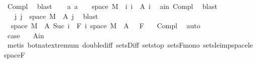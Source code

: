 \begin{isabellebody}
\ Compl{\isacharparenleft}{\kern0pt}{}{\isacharparenright}{\kern0pt}\ \isamarkupfalse%
\ blast\isanewline
\ \ \isamarkupfalse%
\ a{\isacharcolon}{\kern0pt}\ {\isachardoublequoteopen}a\ {\isacharequal}{\kern0pt}\ {\isacharbraceleft}{\kern0pt}{}{\isachardot}{\kern0pt}{\isachardot}{\kern0pt}{\isacharbraceright}{\kern0pt}\ {\isasymtimes}\ space\ M\ {\isacharminus}{\kern0pt}\ {\isacharparenleft}{\kern0pt}{\isasymUnion}i{\isachardot}{\kern0pt}\ {\isacharbraceleft}{\kern0pt}i{\isacharbraceright}{\kern0pt}\ {\isasymtimes}\ A\ i{\isacharparenright}{\kern0pt}{\isachardoublequoteclose}\ \isamarkupfalse%
\ a{\isacharunderscore}{\kern0pt}in\ Compl{\isacharparenleft}{\kern0pt}{}{\isacharparenright}{\kern0pt}\ \isamarkupfalse%
\ blast\isanewline
\ \ \isamarkupfalse%
\ \isamarkupfalse%
\ {\isachardoublequoteopen}{\isachardot}{\kern0pt}{\isachardot}{\kern0pt}{\isachardot}{\kern0pt}\ {\isacharequal}{\kern0pt}\ {\isacharparenleft}{\kern0pt}{\isasymUnion}j{\isachardot}{\kern0pt}\ {\isacharbraceleft}{\kern0pt}j{\isacharbraceright}{\kern0pt}\ {\isasymtimes}\ {\isacharparenleft}{\kern0pt}space\ M\ {\isacharminus}{\kern0pt}\ A\ j{\isacharparenright}{\kern0pt}{\isacharparenright}{\kern0pt}{\isachardoublequoteclose}\ \isamarkupfalse%
\ blast\isanewline
\ \ \isamarkupfalse%
\ \isamarkupfalse%
\ {\isacharasterisk}{\kern0pt}{\isacharcolon}{\kern0pt}\ {\isachardoublequoteopen}{\isacharparenleft}{\kern0pt}space\ M\ {\isacharminus}{\kern0pt}\ A\ {\isacharparenleft}{\kern0pt}Suc\ i{\isacharparenright}{\kern0pt}{\isacharparenright}{\kern0pt}\ {\isasymin}\ F\ i{\isachardoublequoteclose}\ {\isachardoublequoteopen}{\isacharparenleft}{\kern0pt}space\ M\ {\isacharminus}{\kern0pt}\ A\ {}{\isacharparenright}{\kern0pt}\ {\isasymin}\ F\ {}{\isachardoublequoteclose}\ \isamarkupfalse%
\ Compl{\isacharparenleft}{\kern0pt}{}{\isacharcomma}{\kern0pt}{}{\isacharparenright}{\kern0pt}\ \isamarkupfalse%
\ auto\isanewline
\ \ \isacommand{{\isacharbraceleft}{\kern0pt}}\isamarkupfalse%
\isanewline
\ \ \ \ \isamarkupfalse%
\ {}\isanewline
\ \ \ \ \isamarkupfalse%
\ \isamarkupfalse%
\ {\isacharquery}{\kern0pt}case\ \isamarkupfalse%
\ {\isacharasterisk}{\kern0pt}\ A{\isacharunderscore}{\kern0pt}in\ \isamarkupfalse%
\ {\isacharparenleft}{\kern0pt}metis\ bot{\isacharunderscore}{\kern0pt}nat{\isacharunderscore}{\kern0pt}{}{\isachardot}{\kern0pt}extremum\ double{\isacharunderscore}{\kern0pt}diff\ sets{\isachardot}{\kern0pt}Diff\ sets{\isachardot}{\kern0pt}top\ sets{\isacharunderscore}{\kern0pt}F{\isacharunderscore}{\kern0pt}mono\ sets{\isacharunderscore}{\kern0pt}le{\isacharunderscore}{\kern0pt}imp{\isacharunderscore}{\kern0pt}space{\isacharunderscore}{\kern0pt}le\ space{\isacharunderscore}{\kern0pt}F{\isacharparenright}{\kern0pt}\isanewline

\end{isabellebody}
